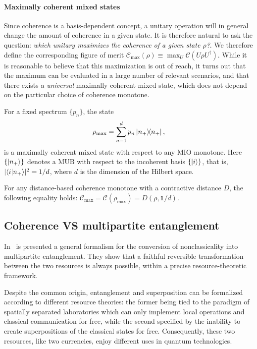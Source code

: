 \documentclass[12pt]{report}
\newcommand{\on}[1]{\operatorname{#1}}
\begin{document}
\paragraph{Maximally coherent mixed states~\cite{streltsov2016maximal}}
Since coherence is a basis-dependent concept, a unitary operation will in general change the amount of coherence in a given state.
It is therefore natural to ask the question: \emph{which unitary maximizes the coherence of a given state $\rho$?}.
We therefore define the corresponding figure of merit
$\mathcal C_{\on{max}}(\rho) \equiv \max_U \mathcal C(U\rho U^\dagger)$.
While it is reasonable to believe that this maximization is out of reach, it turns out that the maximum can be evaluated in a large number of relevant scenarios, and that there exists a \emph{universal} maximally coherent mixed state, which does not depend on the particular choice of coherence monotone.
\begin{thm}
	For a fixed spectrum $\{ p_n \}$, the state
	\begin{equation}
		\rho_{\on{max}} = \sum_{n=1}^d p_n \ketbra{n_+},
	\end{equation}
	is a maximally coherent mixed state with respect to any \ac{MIO} monotone.
	Here $\{ \ket{n_+} \}$ denotes a \ac{MUB} with respect to the incoherent basis $\{ \ket{i} \}$,
	that is, $\lvert \braket{i}{n_+}\rvert^2 = 1/d$, where $d$ is the dimension of the Hilbert space.
\end{thm}
\begin{thm}
	For any distance-based coherence monotone with a contractive distance $D$,
	the following equality holds:
	$\mathcal C_{\on{max}} = \mathcal C(\rho_{\on{max}}) = D(\rho, \mathds{1} / d)$.
\end{thm}

\subsection{Coherence VS multipartite entanglement}
\parencite{regula2017converting,killoran2016converting}

In~\cite{regula2017converting} is presented a general formalism for the conversion of nonclassicality into multipartite entanglement.
They show that a faithful reversible transformation between the two resources is always possible, within a precise resource-theoretic framework.

Despite the common origin, entanglement and superposition can be formalized according to different resource theories:
the former being tied to the paradigm of spatially separated laboratories which can only implement local operations and classical communication for free,
while the second specified by the inability to create superpositions of the classical states for free.
Consequently, these two resources, like two currencies, enjoy different uses in quantum technologies.
\end{document}
